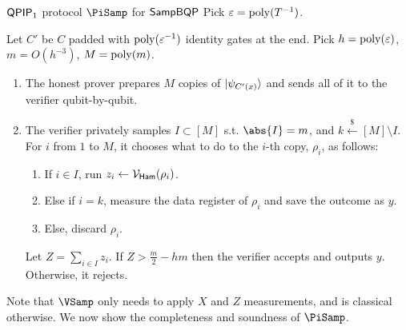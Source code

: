 \begin{protocol}{$\operatorname{\mathsf{QPIP}}_1$ protocol $\PiSamp$ for $\operatorname{\mathsf{SampBQP}}$}\label{ProtoQPIP1}
	Pick $\varepsilon=\operatorname*{\operatorname{poly}}(T^{-1})$.
	
	Let $C'$ be $C$ padded with $\operatorname*{\operatorname{poly}}(\varepsilon^{-1})$ identity gates at the end.
	Pick $h=\operatorname*{\operatorname{poly}}(\varepsilon)$, $m=O(h^{-3})$, $M=\operatorname*{\operatorname{poly}}(m)$.
	
	
	
	
	

	\begin{enumerate}
		\item The honest prover prepares $M$ copies of $\ket{\psi_{C'(x)}}$ and sends all of it to the verifier qubit-by-qubit.
		\item The verifier privately samples $I\subset[M]$ s.t. $\abs{I}=m$, and $k\xleftarrow{\$}[M]\setminus I$.
			For $i$ from $1$ to $M$, it chooses what to do to the $i$-th copy, $\rho_i$, as follows:
		\begin{enumerate}
			\item If $i\in I$, run $z_i\leftarrow\mathcal{V}_{\mathsf{Ham}}(\rho_i)$.
			\item Else if $i=k$, measure the data register  of $\rho_i$ and save the outcome as $y$.
			\item Else, discard $\rho_i$.
		\end{enumerate}
			Let $Z=\sum_{i\in I} z_i$. If $Z>\frac{m}{2}-hm$ then the verifier accepts and outputs $y$. Otherwise, it rejects.
	\end{enumerate}
\end{protocol}

Note that $\VSamp$ only needs to apply $X$ and $Z$ measurements, and is classical otherwise. We now show the completeness and soundness of $\PiSamp$.

